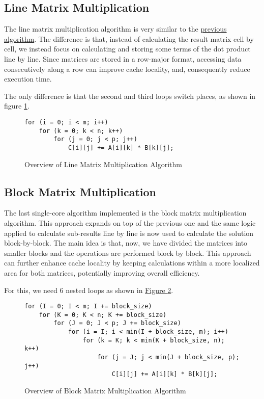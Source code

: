 \subsection{Line Matrix Multiplication}

The line matrix multiplication algorithm is very similar to the \hyperref[section:algorithms:naive]{previous algorithm}. The difference is that, instead of calculating the result matrix cell by cell, we instead focus on calculating and storing some terms of the dot product line by line. Since matrices are stored in a row-major format, accessing data consecutively along a row can improve cache locality, and, consequently reduce execution time.

The only difference is that the second and third loops switch places, as shown in figure \ref{fig:algo:line}.

\begin{figure}[ht!]
\begin{verbatim}
for (i = 0; i < m; i++)
    for (k = 0; k < n; k++)
        for (j = 0; j < p; j++)
            C[i][j] += A[i][k] * B[k][j];
\end{verbatim}
\caption{Overview of Line Matrix Multiplication Algorithm}
\label{fig:algo:line}
\end{figure}

\subsection{Block Matrix Multiplication}

The last single-core algorithm implemented is the block matrix multiplication algorithm. This approach expands on top of the previous one and the same logic applied to calculate sub-results line by line is now used to calculate the solution block-by-block. The main idea is that, now, we have divided the matrices into smaller blocks and the operations are performed block by block. This approach can further enhance cache locality by keeping calculations within a more localized area for both matrices, potentially improving overall efficiency.

For this, we need 6 nested loops as shown in \hyperref[fig:algo:block]{Figure \ref{fig:algo:block}}.

\begin{figure}[ht!]
\begin{verbatim}
for (I = 0; I < m; I += block_size)
    for (K = 0; K < n; K += block_size)
        for (J = 0; J < p; J += block_size)
            for (i = I; i < min(I + block_size, m); i++)
                for (k = K; k < min(K + block_size, n); k++)
                    for (j = J; j < min(J + block_size, p); j++)
                        C[i][j] += A[i][k] * B[k][j];
\end{verbatim}
\caption{Overview of Block Matrix Multiplication Algorithm}
\label{fig:algo:block}
\end{figure}

